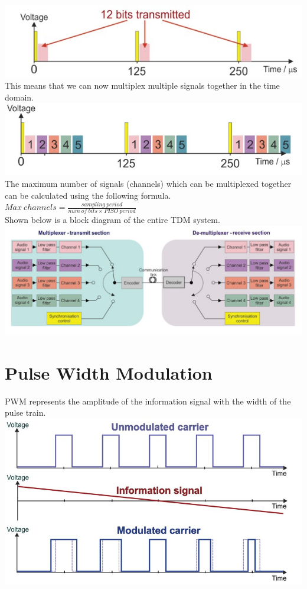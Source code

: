 \documentclass[a4paper,11pt, twocolumn]{article}
\begin{document}
\includegraphics[width=\linewidth]{tdm2.jpg}
This means that we can now multiplex multiple signals together in the time domain. 
\includegraphics[width=\linewidth]{tdm3.jpg}
The maximum number of signals (channels) which can be multiplexed together can be calculated using the following formula.\\
$\displaystyle Max\ channels= \frac{sampling\ period}{num\ of\ bits \times PISO\ period}  $\\
Shown below is a block diagram of the entire TDM system.
\includegraphics[width=\linewidth]{tdmFull.jpg}

\section{Pulse Width Modulation}
PWM represents the amplitude of the information signal with the width of the pulse train.
\includegraphics[width=\linewidth]{pwm.jpg}
\end{document}
